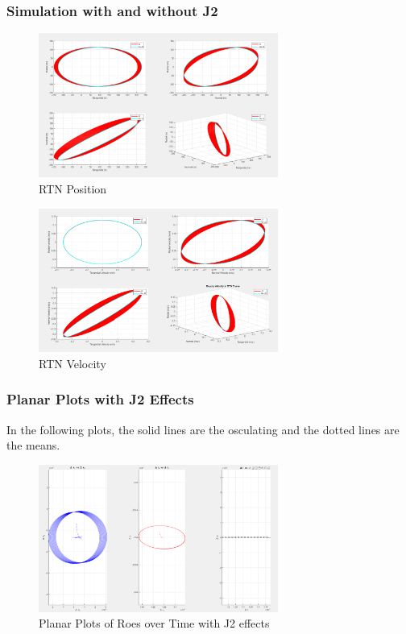 \subsubsection{Simulation with and without J2}
\begin{figure}[H]
    \centering
    \includegraphics[width=0.7\textwidth]{PS4/Figures/rtn_position.png}
    \caption{RTN Position}
    \label{fig:hcw_velocity}
\end{figure}
\begin{figure}[H]
    \centering
    \includegraphics[width=0.7\textwidth]{PS4/Figures/rtn_velocity.png}
    \caption{RTN Velocity}
    \label{fig:hcw_velocity}
\end{figure}

\subsubsection{Planar Plots with J2 Effects}
In the following plots, the solid lines are the osculating and the dotted lines are the means.
\begin{figure}[H]
    \centering
    \includegraphics[width=0.7\textwidth]{PS4/Figures/problem5.png}
    \caption{Planar Plots of Roes over Time with J2 effects}
    \label{fig:hcw_velocity}
\end{figure}

